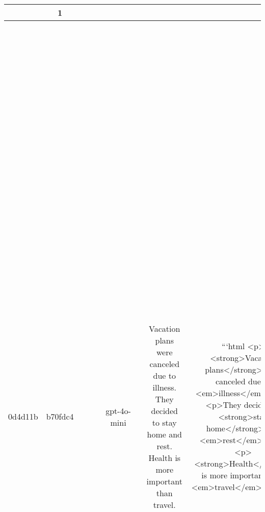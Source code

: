 \begin{table}[h!]
\begin{tabular}{|c|c|c|c|c|c|c|c|c|c|}
{{Given these points, the output does not wholly comply with the description.

ERR & 1\\
\hline
0d4d11b & b70fdc4 &  &  & gpt-4o-mini & Vacation plans were canceled due to illness. They decided to stay home and rest. Health is more important than travel. & ```html
<p><strong>Vacation plans</strong> were canceled due to <em>illness</em>.</p>
<p>They decided to <strong>stay home</strong> and <em>rest</em>.</p>
<p><strong>Health</strong> is more important than <em>travel</em>.</p>
``` & ok & The given output consists of three sentences, each wrapped in a <p> tag, which meets the requirement of having at least three <p> tags. Inside each <p> tag, there is exactly one <strong> tag and at least one <em> tag, which complies with the requirement to have one <strong> tag and multiple <em> tags to emphasize key words and phrases. 

In summary, the output adheres to what is stipulated in the description: 

1. There are three <p> tags, satisfying the minimum requirement.
2. Each <p> tag contains one <strong> tag and multiple <em> tags.

No violation has been detected based on the provided description. 

OK & 1\\
\hline
0d4d11b & b70fdc4 &  &  & gemma2:9b & Vacation plans were canceled due to illness. They decided to stay home and rest. Health is more important than travel. & <p><strong>Vacation</strong> plans were canceled due to <em>illness</em>.</p>
<p>They decided to stay <strong>home</strong> and <em>rest</em>.</p>
<p><em>Health</em> is more important than <strong>travel</strong>.</p> 


Let me know if you would like any further modifications made to this HTML! & ok & The chatbot's output contains three <p> tags, which meets the guideline of having at least three <p> tags. Each <p> tag also includes one <strong> tag, fulfilling the requirement that a <strong> tag must be inside each <p> tag. Additionally, each <p> tag contains one or more <em> tags to emphasize key words or phrases. There are no violations in terms of the description provided. 

No violation.
OK & 1\\
\hline
0d4d11b & b70fdc4 &  &  & qwen2.5:3b & Vacation plans were canceled due to illness. They decided to stay home and rest. Health is more important than travel. & <p><strong>During</strong> the planning stage, <em>Vacation plans</em> had been set in motion. However, <strong>a change of plan</strong> was required when one member of the group began to feel <strong>unwell</strong>. The situation was not a case of an emergency but rather, illness dictated that rest became crucial. Consequently, they chose to continue their activities at home by engaging in relaxation or reading some books for entertainment.</p>

}}
\end{tabular}
\end{table}
